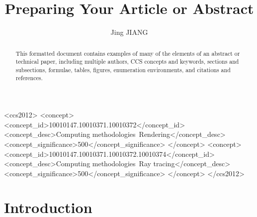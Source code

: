 \documentclass[sigconf, review]{acmart}
\begin{document}
\title{Preparing Your Article or Abstract}

\author{Jing JIANG}

\renewcommand{\shortauthors}{DeJohnette, Rowland-Smith, Badeeri, and Foyt}

\begin{abstract}
This formatted document contains examples of many of the elements of an abstract or technical paper, including multiple authors, CCS concepts and keywords, sections and subsections, formulae, tables, figures, enumeration environments, and citations and references. 
\end{abstract}

\begin{CCSXML}
<ccs2012>
<concept>
<concept_id>10010147.10010371.10010372</concept_id>
<concept_desc>Computing methodologies~Rendering</concept_desc>
<concept_significance>500</concept_significance>
</concept>
<concept>
<concept_id>10010147.10010371.10010372.10010374</concept_id>
<concept_desc>Computing methodologies~Ray tracing</concept_desc>
<concept_significance>500</concept_significance>
</concept>
</ccs2012>
\end{CCSXML}




\maketitle

\section{Introduction}


\end{document}
